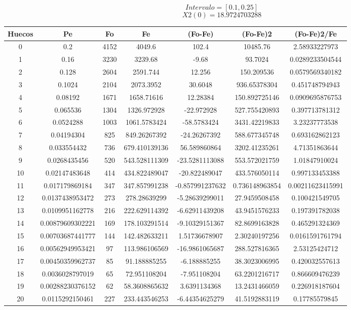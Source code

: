 \documentclass{article}
\begin{document}
$$
Intervalo = [0.1, 0.25]
$$
$$
X2(0) = 18.9724703288
$$
\begin{tabular}{|c|c|c|c|c|c|c|}
Huecos&Pe&Fo&Fe&(Fo{-}Fe)&(Fo{-}Fe)2&(Fo{-}Fe)2/Fe\\
\hline
0&0.2&4152&4049.6&102.4&10485.76&2.58933227973\\
\hline
1&0.16&3230&3239.68&{-}9.68&93.7024&0.0289233504544\\
\hline
2&0.128&2604&2591.744&12.256&150.209536&0.0579569340182\\
\hline
3&0.1024&2104&2073.3952&30.6048&936.65378304&0.451748794943\\
\hline
4&0.08192&1671&1658.71616&12.28384&150.892725146&0.0909695876753\\
\hline
5&0.065536&1304&1326.972928&{-}22.972928&527.755420893&0.397713781312\\
\hline
6&0.0524288&1003&1061.5783424&{-}58.5783424&3431.42219833&3.23237773538\\
\hline
7&0.04194304&825&849.26267392&{-}24.26267392&588.677345748&0.693162862123\\
\hline
8&0.033554432&736&679.410139136&56.589860864&3202.41235261&4.71351863644\\
\hline
9&0.0268435456&520&543.528111309&{-}23.5281113088&553.572021759&1.01847910024\\
\hline
10&0.02147483648&414&434.822489047&{-}20.822489047&433.576050114&0.997133453388\\
\hline
11&0.017179869184&347&347.857991238&{-}0.857991237632&0.736148963854&0.00211623415991\\
\hline
12&0.0137438953472&273&278.28639299&{-}5.28639299011&27.9459508458&0.100421549705\\
\hline
13&0.0109951162778&216&222.629114392&{-}6.62911439208&43.9451576233&0.197391782038\\
\hline
14&0.00879609302221&169&178.103291514&{-}9.10329151367&82.8699163828&0.465291324369\\
\hline
15&0.00703687441777&144&142.482633211&1.51736678907&2.30240197256&0.0161591761794\\
\hline
16&0.00562949953421&97&113.986106569&{-}16.9861065687&288.527816365&2.53125424712\\
\hline
17&0.00450359962737&85&91.188885255&{-}6.188885255&38.3023006995&0.420032557613\\
\hline
18&0.0036028797019&65&72.951108204&{-}7.951108204&63.2201216717&0.866609476239\\
\hline
19&0.00288230376152&62&58.3608865632&3.6391134368&13.2431466059&0.226918187604\\
\hline
20&0.0115292150461&227&233.443546253&{-}6.44354625279&41.5192883119&0.17785579845\\
\end{tabular}
\end{document}
